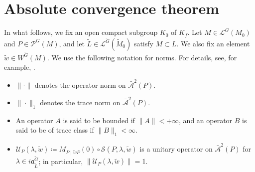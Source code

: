 \documentclass[12pt]{amsart}
\theoremstyle{definition}
\theoremstyle{plain}
\theoremstyle{remark}
\def\inf{\infty}
\newcommand{\fa}{\mathfrak{a}}
\newcommand{\cA}{\mathcal{A}}
\newcommand{\cL}{\mathcal{L}}
\newcommand{\cP}{\mathcal{P}}
\newcommand{\cU}{\mathcal{U}}
\newcommand{\sS}{\mathscr{S}}
\numberwithin{equation}{section}
\newcommand{\tG}{\widetilde{G}}
\newcommand{\tM}{\widetilde{M}}
\newcommand{\tL}{\widetilde{L}}
\newcommand{\tw}{\widetilde{w}}
\begin{document}
\section{Absolute convergence theorem}\label{sec:absoconv}

In what follows, we fix an open compact subgroup $K_0$ of $K_f$.
Let $M\in\cL^G(M_0)$ and $P\in\cP^G(M)$, and let $\tL\in\cL^{\tG}(\tM_0)$ satisfy $M\subset L$.
We also fix an element $\tw\in W^{\tG}(M)$.
We use the following notation for norms. For details, see, for example, \cite{RS80}.
\begin{itemize}
    \item $\| \cdot\|$ denotes the operator norm on $\bar{\cA}^2(P)$.
    \item $\| \cdot\|_1$ denotes the trace norm on $\bar{\cA}^2(P)$.
    \item An operator $A$ is said to be bounded if $\|A\|<+\inf$, and an operator $B$ is said to be of trace class if $\|B\|_1<\inf$.
    \item $\cU_P(\lambda,\tw)\coloneqq M_{P\mid \tw P}(0) \circ \sS(P,\lambda,\tw)$ is a unitary operator on $\bar{\cA}^2(P)$ for $\lambda\in i\fa_{\tL}^{\tG}$; in particular, $\| \cU_P(\lambda,\tw)\|=1$.
\end{itemize}
\end{document}
